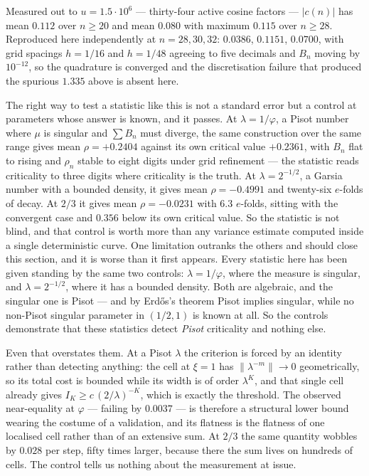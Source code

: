 \documentclass[11pt]{article}
\theoremstyle{remark}
\newcommand{\lam}{\lambda}
\begin{document}
Measured out to $u=1.5\cdot10^6$ --- thirty-four active cosine factors --- $|c(n)|$ has mean $0.112$ over
$n\ge20$ and mean $0.080$ with maximum $0.115$ over $n\ge28$. Reproduced here independently at
$n=28,30,32$: $0.0386$, $0.1151$, $0.0700$, with grid spacings $h=1/16$ and $h=1/48$ agreeing to five
decimals and $B_n$ moving by $10^{-12}$, so the quadrature is converged and the discretisation failure
that produced the spurious $1.335$ above is absent here.

The right way to test a statistic like this is not a standard error but a control at parameters whose
answer is known, and it passes. At $\lam=1/\varphi$, a Pisot number where $\mu$ is singular and
$\sum B_n$ must diverge, the same construction over the same range gives mean $\rho=+0.2404$ against its
own critical value $+0.2361$, with $B_n$ flat to rising and $\rho_n$ stable to eight digits under grid
refinement --- the statistic reads criticality to three digits where criticality is the truth. At
$\lam=2^{-1/2}$, a Garsia number with a bounded density, it gives mean $\rho=-0.4991$ and twenty-six
$e$-folds of decay. At $2/3$ it gives mean $\rho=-0.0231$ with $6.3$ $e$-folds, sitting with the
convergent case and $0.356$ below its own critical value. So the statistic is not blind, and that control
is worth more than any variance estimate computed inside a single deterministic curve.
One limitation outranks the others and should close this section, and it is worse than it first appears.
Every statistic here has been given standing by the same two controls: $\lam=1/\varphi$, where the measure
is singular, and $\lam=2^{-1/2}$, where it has a bounded density. Both are algebraic, and the singular one
is Pisot --- and by Erd\H os's theorem Pisot implies singular, while no non-Pisot singular parameter in
$(1/2,1)$ is known at all. So the controls demonstrate that these statistics detect \emph{Pisot}
criticality and nothing else.

Even that overstates them. At a Pisot $\lam$ the criterion is forced by an identity rather than detecting
anything: the cell at $\xi=1$ has $\|\lam^{-m}\|\to0$ geometrically, so its total cost is bounded while
its width is of order $\lam^{K}$, and that single cell already gives $I_K\ge c\,(2/\lam)^{-K}$, which is
exactly the threshold. The observed near-equality at $\varphi$ --- failing by $0.0037$ --- is therefore a
structural lower bound wearing the costume of a validation, and its flatness is the flatness of one
localised cell rather than of an extensive sum. At $2/3$ the same quantity wobbles by $0.028$ per step,
fifty times larger, because there the sum lives on hundreds of cells. The control tells us nothing about
the measurement at issue.
\end{document}
